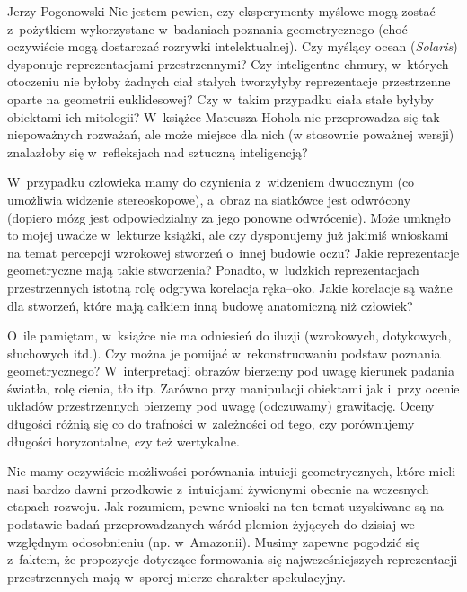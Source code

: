 \begin{newrevplenv}{Jerzy Pogonowski}
Nie jestem pewien, czy eksperymenty myślowe mogą zostać z~pożytkiem wykorzystane w~badaniach poznania geometrycznego (choć
oczywiście mogą dostarczać rozrywki intelektualnej). Czy myślący
ocean ({\em Solaris}) dysponuje reprezentacjami przestrzennymi?
Czy inteligentne chmury, w~których otoczeniu nie byłoby żadnych
ciał stałych tworzyłyby reprezentacje przestrzenne oparte na
geometrii euklidesowej? Czy w~takim przypadku ciała stałe byłyby
obiektami ich mitologii? W~książce Mateusza Hohola nie
przeprowadza się tak niepoważnych rozważań, ale może miejsce dla
nich (w stosownie poważnej wersji) znalazłoby się w~refleksjach
nad sztuczną inteligencją?

W~przypadku człowieka mamy do czynienia z~widzeniem dwuocznym (co
umożliwia widzenie stereoskopowe), a~obraz na siatkówce jest
odwrócony (dopiero mózg jest odpowiedzialny za jego ponowne
odwrócenie). Może umknęło to mojej uwadze w~lekturze książki, ale
czy dysponujemy już jakimiś wnioskami na temat percepcji wzrokowej
stworzeń o~innej budowie oczu? Jakie reprezentacje geometryczne
mają takie stworzenia? Ponadto, w~ludzkich reprezentacjach
przestrzennych istotną rolę odgrywa korelacja ręka--oko. Jakie
korelacje są ważne dla stworzeń, które mają całkiem inną budowę
anatomiczną niż człowiek?

O~ile pamiętam, w~książce nie ma odniesień do iluzji (wzrokowych,
dotykowych, słuchowych itd.). Czy można je pomijać w~rekonstruowaniu podstaw poznania geometrycznego? W~interpretacji
obrazów bierzemy pod uwagę kierunek padania światła, rolę cienia,
tło itp. Zarówno przy manipulacji obiektami jak i~przy ocenie
układów przestrzennych bierzemy pod uwagę (odczuwamy) grawitację.
Oceny długości różnią się co do trafności w~zależności od tego,
czy porównujemy długości horyzontalne, czy też wertykalne.

Nie mamy oczywiście możliwości porównania intuicji geometrycznych,
które mieli nasi bardzo dawni przodkowie z~intuicjami żywionymi
obecnie na wczesnych etapach rozwoju. Jak rozumiem, pewne wnioski
na ten temat uzyskiwane są na podstawie badań przeprowadzanych
wśród plemion żyjących do dzisiaj we względnym odosobnieniu (np. w~Amazonii). Musimy zapewne pogodzić się z~faktem, że propozycje
dotyczące formowania się najwcześniejszych reprezentacji
przestrzennych mają w~sporej mierze charakter spekulacyjny.


\end{newrevplenv}
